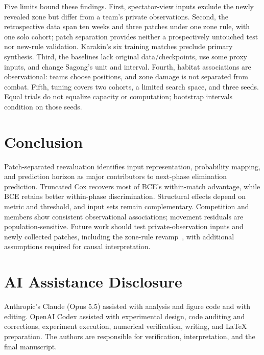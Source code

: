 \documentclass[sigconf,anonymous,nonacm]{acmart}
\begin{document}
Five limits bound these findings. First, spectator-view inputs exclude the newly revealed zone but differ from a team's private observations. Second, the retrospective data span ten weeks and three patches under one zone rule, with one solo cohort; patch separation provides neither a prospectively untouched test nor new-rule validation. Karakin's six training matches preclude primary synthesis. Third, the baselines lack original data/checkpoints, use some proxy inputs, and change Sagong's unit and interval. Fourth, habitat associations are observational: teams choose positions, and zone damage is not separated from combat. Fifth, tuning covers two cohorts, a limited search space, and three seeds. Equal trials do not equalize capacity or computation; bootstrap intervals condition on those seeds.

\section{Conclusion}
\label{sec:conclusion}
Patch-separated reevaluation identifies input representation, probability mapping, and prediction horizon as major contributors to next-phase elimination prediction. Truncated Cox recovers most of BCE's within-match advantage, while BCE retains better within-phase discrimination. Structural effects depend on metric and threshold, and input sets remain complementary. Competition and members show consistent observational associations; movement residuals are population-sensitive. Future work should test private-observation inputs and newly collected patches, including the zone-rule revamp~\cite{PUBGBlueZone2026}, with additional assumptions required for causal interpretation.

\section*{AI Assistance Disclosure}
Anthropic's Claude (Opus 5.5) assisted with analysis and figure code and with editing. OpenAI Codex assisted with experimental design, code auditing and corrections, experiment execution, numerical verification, writing, and LaTeX preparation. The authors are responsible for verification, interpretation, and the final manuscript.



\end{document}
